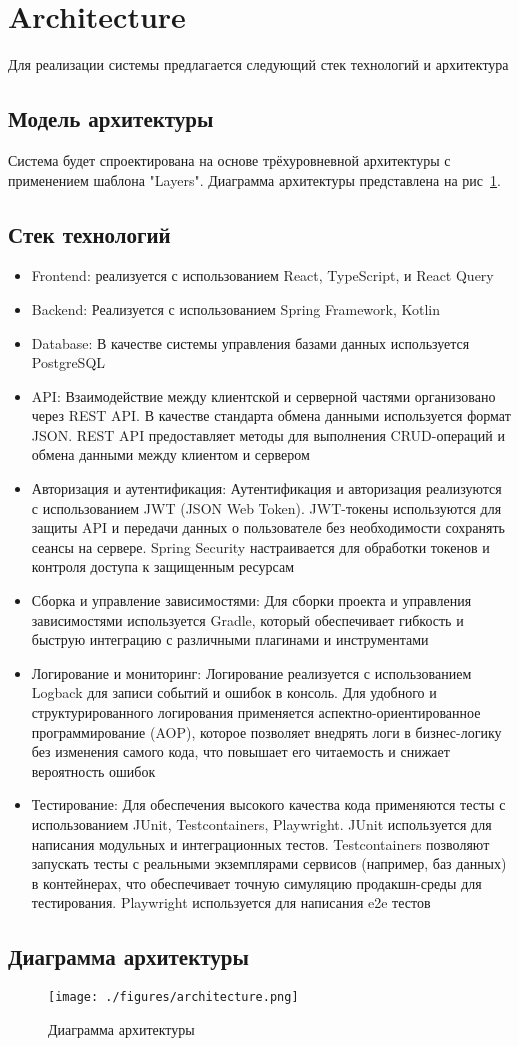 \section{Architecture}
Для реализации системы предлагается следующий стек технологий и архитектура

\subsection{Модель архитектуры}
Система будет спроектирована на основе трёхуровневной архитектуры с применением шаблона "Layers".
Диаграмма архитектуры представлена на рис~\ref{fig:arch}.
\subsection{Стек технологий}
\begin{itemize}
  \item Frontend: реализуется с использованием React, TypeScript, и React Query
  \item Backend: Реализуется с использованием Spring Framework, Kotlin
  \item Database: В качестве системы управления базами данных используется PostgreSQL
  \item API: Взаимодействие между клиентской и серверной частями организовано через REST API. В качестве стандарта обмена данными используется формат JSON.
        REST API предоставляет методы для выполнения CRUD-операций и обмена данными
        между клиентом и сервером \item Авторизация и аутентификация: Аутентификация и
        авторизация реализуются с использованием JWT (JSON Web Token).
        JWT-токены используются для защиты API и передачи данных о пользователе без
        необходимости сохранять сеансы на сервере.
        Spring Security настраивается для обработки токенов и контроля доступа к
        защищенным ресурсам \item Сборка и управление зависимостями: Для сборки проекта
        и управления зависимостями используется Gradle, который обеспечивает гибкость и
        быструю интеграцию с различными плагинами и инструментами \item Логирование и
        мониторинг: Логирование реализуется с использованием Logback для записи событий
        и ошибок в консоль.
        Для удобного и структурированного логирования применяется аспектно-ориентированное программирование (AOP), которое позволяет внедрять логи в бизнес-логику без изменения самого кода, что повышает его читаемость и снижает вероятность ошибок
  \item Тестирование: Для обеспечения высокого качества кода применяются тесты с использованием JUnit, Testcontainers, Playwright.
        JUnit используется для написания модульных и интеграционных тестов.
        Testcontainers позволяют запускать тесты с реальными экземплярами сервисов
        (например, баз данных) в контейнерах, что обеспечивает точную симуляцию
        продакшн-среды для тестирования.
        Playwright используется для написания e2e тестов
\end{itemize}

\subsection{Диаграмма архитектуры}
\begin{figure}[h]
  \centering
  \texttt{[image: ./figures/architecture.png]}
  \caption{Диаграмма архитектуры}\label{fig:arch}
\end{figure}
